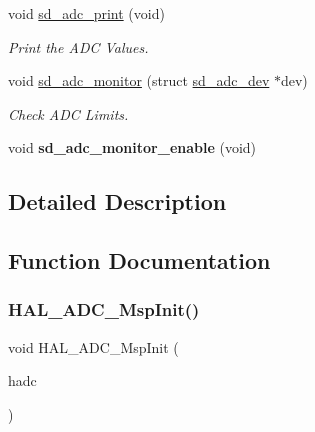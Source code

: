\begin{DoxyCompactItemize}
\mbox{\label{group___s_d___a_d_c___functions_ga152fa7d6af28e9a27f32b00ac179f478}} 
void \mbox{\hyperlink{group___s_d___a_d_c___functions_ga152fa7d6af28e9a27f32b00ac179f478}{sd\+\_\+adc\+\_\+print}} (void)
\begin{DoxyCompactList}\small\item\em Print the A\+DC Values. \end{DoxyCompactList}\item 
\mbox{\label{group___s_d___a_d_c___functions_gac3a9e92d1ff530dcaae393eb513bdb57}} 
void \mbox{\hyperlink{group___s_d___a_d_c___functions_gac3a9e92d1ff530dcaae393eb513bdb57}{sd\+\_\+adc\+\_\+monitor}} (struct \mbox{\hyperlink{structsd__adc__dev}{sd\+\_\+adc\+\_\+dev}} $\ast$dev)
\begin{DoxyCompactList}\small\item\em Check A\+DC Limits. \end{DoxyCompactList}\item 
\mbox{\label{group___s_d___a_d_c___functions_ga3ec0aea321c0130f3507160e1fb5682a}} 
void {\bfseries sd\+\_\+adc\+\_\+monitor\+\_\+enable} (void)
\end{DoxyCompactItemize}


\subsection{Detailed Description}


\subsection{Function Documentation}
\mbox{\label{group___s_d___a_d_c___functions_gaa30863492d5c3103e3e8ce8a63dadd07}} 
\subsubsection{\texorpdfstring{H\+A\+L\+\_\+\+A\+D\+C\+\_\+\+Msp\+Init()}{HAL\_ADC\_MspInit()}}
{\footnotesize\ttfamily void H\+A\+L\+\_\+\+A\+D\+C\+\_\+\+Msp\+Init (\begin{DoxyParamCaption}\item[{A\+D\+C\+\_\+\+Handle\+Type\+Def $\ast$}]{hadc }\end{DoxyParamCaption})}



